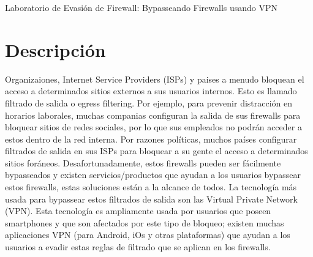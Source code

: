 
\newcommand{\commonfolder}{../../common-files}




\newcommand{\firewallFigs}{./Figs}





\begin{center}
{\LARGE Laboratorio de Evasión de Firewall: Bypasseando Firewalls usando VPN}
\end{center}



\setcounter{task}{1}
\newcommand{\tasks} {\bf {\noindent (\arabic{task})} \addtocounter{task}{1} \,}


\section{Descripción}

Organizaiones, Internet Service Providers (ISPs) y paises a menudo bloquean el acceso a determinados sitios externos a sus usuarios internos. Esto es llamado filtrado de salida o egress filtering.
Por ejemplo, para prevenir distracción en horarios laborales, muchas companias configuran la salida de sus firewalls para bloquear sitios de redes sociales, por lo que sus empleados no podrán acceder a estos dentro de la red interna. Por razones políticas, muchos países configurar filtrados de salida en sus ISPs para bloquear a su gente el acceso a determinados sitios foráneos. Desafortunadamente, estos firewalls pueden ser fácilmente bypasseados y existen servicios/productos que ayudan a los usuarios bypassear estos firewalls, estas soluciones están a la alcance de todos. La tecnología más usada para bypassear estos filtrados de salida son las Virtual Private Network (VPN).
Esta tecnología es ampliamente usada por usuarios que poseen smartphones y que son afectados por este tipo de bloqueo; existen muchas aplicaciones VPN (para Android, iOs y otras plataformas) que ayudan a los usuarios a evadir estas reglas de filtrado que se aplican en los firewalls.


